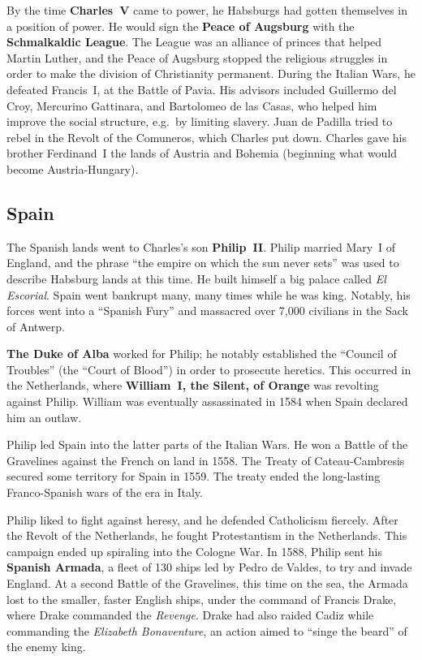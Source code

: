 By the time \textbf{Charles~V} came to power, he Habsburgs had gotten themselves in a position of power.
He would sign the \textbf{Peace of Augsburg} with the \textbf{Schmalkaldic League}.
The League was an alliance of princes that helped Martin Luther,
and the Peace of Augsburg stopped the religious struggles in order to make the division of Christianity permanent.
During the Italian Wars, he defeated Francis~I, at the Battle of Pavia.
His advisors included Guillermo del Croy, Mercurino Gattinara, and Bartolomeo de las Casas,
who helped him improve the social structure, e.g.\ by limiting slavery.
Juan de Padilla tried to rebel in the Revolt of the Comuneros, which Charles put down.
Charles gave his brother Ferdinand~I the lands of Austria and Bohemia (beginning what would become Austria-Hungary).

\subsection*{Spain}

The Spanish lands went to Charles's son \textbf{Philip~II}.
Philip married Mary~I of England, and the phrase ``the empire on which the sun never sets''
was used to describe Habsburg lands at this time.
He built himself a big palace called \textit{El Escorial}.
Spain went bankrupt many, many times while he was king.
Notably, his forces went into a ``Spanish Fury'' and massacred over 7,000 civilians in the Sack of Antwerp.

\textbf{The Duke of Alba} worked for Philip;
he notably established the ``Council of Troubles'' (the ``Court of Blood'') in order to prosecute heretics.
This occurred in the Netherlands, where \textbf{William~I, the Silent, of Orange} was revolting against Philip.
William was eventually assassinated in 1584 when Spain declared him an outlaw.

Philip led Spain into the latter parts of the Italian Wars.
He won a Battle of the Gravelines against the French on land in 1558.
The Treaty of Cateau-Cambresis secured some territory for Spain in 1559.
The treaty ended the long-lasting Franco-Spanish wars of the era in Italy.

Philip liked to fight against heresy, and he defended Catholicism fiercely.
After the Revolt of the Netherlands, he fought Protestantism in the Netherlands.
This campaign ended up spiraling into the Cologne War.
In 1588, Philip sent his \textbf{Spanish Armada}, a fleet of 130 ships led by Pedro de Valdes,
to try and invade England.
At a second Battle of the Gravelines, this time on the sea,
the Armada lost to the smaller, faster English ships, under the command of Francis Drake,
where Drake commanded the \textit{Revenge}.
Drake had also raided Cadiz while commanding the \textit{Elizabeth Bonaventure},
an action aimed to ``singe the beard'' of the enemy king.

